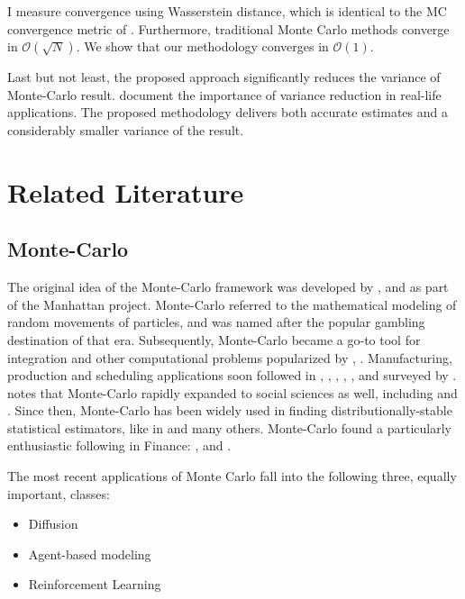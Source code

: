 \documentclass{wscpaperproc}
\theoremstyle{wsc}
\begin{document}
I measure convergence using Wasserstein distance, which is identical to the MC convergence metric of . Furthermore, traditional Monte Carlo methods converge in $\mathcal{O}(\sqrt{N})$. We show that our methodology converges in $\mathcal{O}(1)$.

Last but not least, the proposed approach significantly reduces the variance of Monte-Carlo result.  document the importance of variance reduction in real-life applications. The proposed methodology delivers both accurate estimates and a considerably smaller variance of the result.

\section{Related Literature}
\subsection{Monte-Carlo}

The original idea of the Monte-Carlo framework was developed by ,  and  as part of the Manhattan project. Monte-Carlo referred to the mathematical modeling of random movements of particles, and was named after the popular gambling destination of that era. Subsequently, Monte-Carlo became a go-to tool for integration and other computational problems popularized by , . Manufacturing, production and scheduling applications soon followed in , , , , ,  and surveyed by .   notes that Monte-Carlo rapidly expanded to social sciences as well, including  and . Since then, Monte-Carlo has been widely used in finding distributionally-stable statistical estimators, like in  and many others. Monte-Carlo found a particularly enthusiastic following in Finance: ,  and . 
 
The most recent applications of Monte Carlo fall into the following three, equally important, classes:
\begin{itemize}
    \item Diffusion
    \item Agent-based modeling
    \item Reinforcement Learning
\end{itemize}
\end{document}
